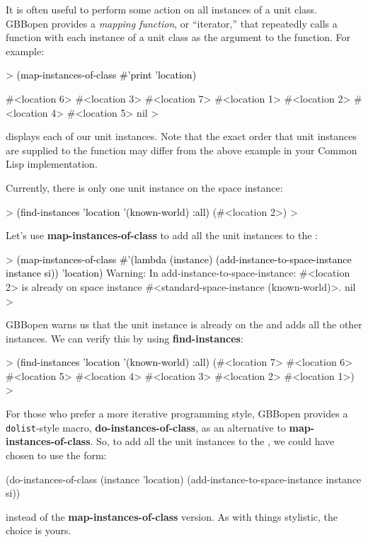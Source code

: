 \documentclass[10pt,twoside,english,pdftex]{article}
\begin{document}
%
%
It is often useful to perform some action on all instances of a unit class.
GBBopen provides a \textit{mapping function}, or ``iterator,'' that repeatedly
calls a function with each instance of a unit class as the argument to the
function.  For example:
%
\begin{example}\color{darkergray}%
  > \textcolor{black}{(map-instances-of-class #'print 'location)}

  #<location 6> 
  #<location 3> 
  #<location 7> 
  #<location 1> 
  #<location 2> 
  #<location 4> 
  #<location 5> 
  nil
  >
\end{example}
%
displays each of our  unit instances.  Note that the exact
order that  unit instances are supplied to the 
function may differ from the above example in your Common Lisp implementation.

%
%
Currently, there is only one  unit instance on the
 space instance:
%
\begin{example}\color{darkergray}%
  > \textcolor{black}{(find-instances 'location '(known-world) :all)}
  (#<location 2>)
  >
\end{example}
%
Let's use \textbf{map-instances-of-class} to add all the  unit
instances to the :
%
\begin{example}\color{darkergray}%
  > \textcolor{black}{(map-instances-of-class 
      #'(lambda (instance) (add-instance-to-space-instance instance si))
      'location)}
  Warning: In add-instance-to-space-instance: #<location 2> is already on space
           instance #<standard-space-instance (known-world)>.
  nil
  >
\end{example}
%
GBBopen warns us that the   unit instance is already on
the  and adds all the other  instances.  We
can verify this by using \textbf{find-instances}:
%
\begin{example}\color{darkergray}%
  > \textcolor{black}{(find-instances 'location '(known-world) :all)}
  (#<location 7> #<location 6> #<location 5> #<location 4> #<location 3>
   #<location 2> #<location 1>)
  >
\end{example}

%
For those who prefer a more iterative programming style, GBBopen provides a
\texttt{dolist}-style macro, \textbf{do-instances-of-class}, as an alternative
to \textbf{map-instances-of-class}.  So, to add all the  unit
instances to the , we could have chosen to use the form:
%
\begin{example}\color{darkergray}%
  (do-instances-of-class (instance 'location)
    (add-instance-to-space-instance instance si))
\end{example}
%
instead of the \textbf{map-instances-of-class} version.  As with things
stylistic, the choice is yours.
\end{document}
